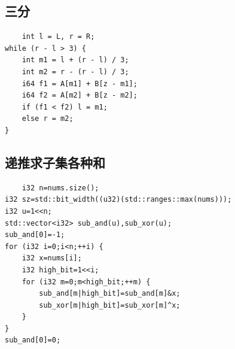 \documentclass[UTF8,twoside]{ctexart}
\begin{document}
\subsection{三分}
\begin{lstlisting}
    int l = L, r = R;
while (r - l > 3) {
    int m1 = l + (r - l) / 3;
    int m2 = r - (r - l) / 3;
    i64 f1 = A[m1] + B[z - m1];
    i64 f2 = A[m2] + B[z - m2];
    if (f1 < f2) l = m1;
    else r = m2;
}
\end{lstlisting}
\subsection{递推求子集各种和}
\begin{lstlisting}
    i32 n=nums.size();
i32 sz=std::bit_width((u32)(std::ranges::max(nums)));
i32 u=1<<n;
std::vector<i32> sub_and(u),sub_xor(u);
sub_and[0]=-1;
for (i32 i=0;i<n;++i) {
    i32 x=nums[i];
    i32 high_bit=1<<i;
    for (i32 m=0;m<high_bit;++m) {
        sub_and[m|high_bit]=sub_and[m]&x;
        sub_xor[m|high_bit]=sub_xor[m]^x;
    }
}
sub_and[0]=0;
\end{lstlisting}
\end{document}
